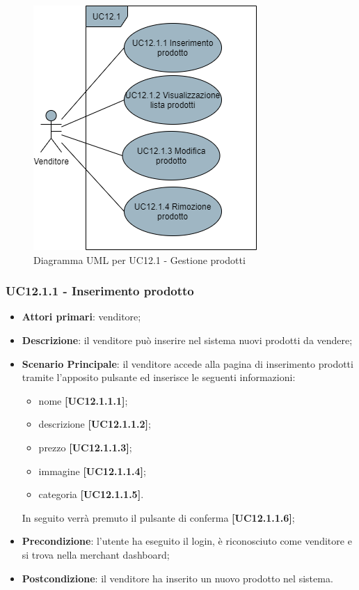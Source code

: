 \begin{figure}[H]
\centering
\includegraphics[scale=0.6]{res/UseCase/Immagini/GestioneProdotti}
\caption{Diagramma UML per UC12.1 - Gestione prodotti}
\end{figure}

\subsubsection{UC12.1.1 - Inserimento prodotto}
\begin{itemize}
\item \textbf{Attori primari}: venditore;
\item \textbf{Descrizione}: il venditore può inserire nel sistema nuovi prodotti da vendere;
\item \textbf{Scenario Principale}: il venditore accede alla pagina di inserimento prodotti tramite l'apposito pulsante ed inserisce le seguenti informazioni:
\begin{itemize}
	\item nome \textbf{[UC12.1.1.1]};
	\item descrizione \textbf{[UC12.1.1.2]};
	\item prezzo \textbf{[UC12.1.1.3]};
	\item immagine \textbf{[UC12.1.1.4]};
	\item categoria \textbf{[UC12.1.1.5]}.
\end{itemize}
In seguito verrà premuto il pulsante di conferma \textbf{[UC12.1.1.6]};
\item \textbf{Precondizione}: l'utente ha eseguito il login, è riconosciuto come venditore e si trova nella merchant dashboard;
\item \textbf{Postcondizione}: il venditore ha inserito un nuovo prodotto nel sistema.
\end{itemize}

